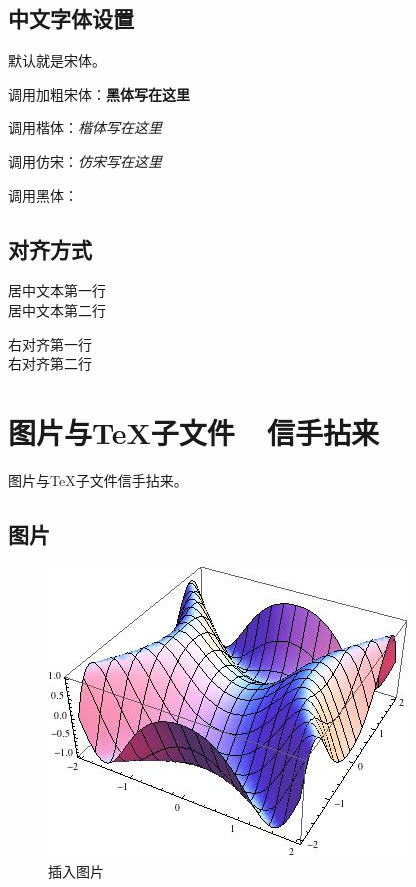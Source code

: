 \documentclass[zihao=-4]{ctexart}
\begin{document}
\subsection{中文字体设置}

默认就是宋体。

调用加粗宋体：\textbf{黑体写在这里}

调用楷体：\textit{楷体写在这里}

调用仿宋：\textsl{仿宋写在这里}

调用黑体：

\subsection{对齐方式}


\begin{center} 
居中文本第一行\\
居中文本第二行\\
\end{center}

\begin{flushright}
右对齐第一行\\
右对齐第二行\\
\end{flushright}




\section{图片与TeX子文件\ \ 信手拈来}

图片与TeX子文件信手拈来。

\subsection{图片}

\begin{figure}
    \centering
    \includegraphics[scale=0.4]{include_picture/picture.jpg}
    \caption{插入图片}
\end{figure}
\end{document}
